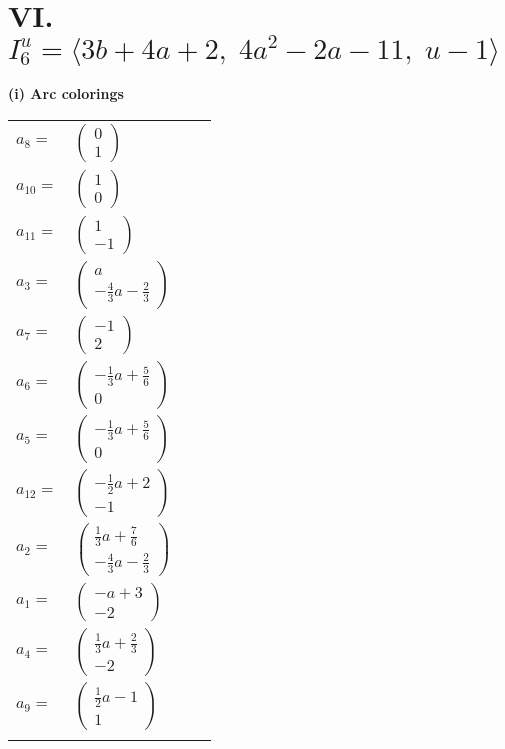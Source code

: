 \documentclass[1p]{elsarticle_modified}
\theoremstyle{definition}
\begin{document}
\centering \section*{VI. $I^u_{6}= \langle 3 b+4 a+2,\;4 a^2-2 a-11,\;u-1 \rangle$}
\flushleft \textbf{(i) Arc colorings}\\
\begin{tabular}{m{7pt} m{180pt} m{7pt} m{180pt} }
\flushright $a_{8}=$&$\begin{pmatrix}0\\1\end{pmatrix}$ \\
\flushright $a_{10}=$&$\begin{pmatrix}1\\0\end{pmatrix}$ \\
\flushright $a_{11}=$&$\begin{pmatrix}1\\-1\end{pmatrix}$ \\
\flushright $a_{3}=$&$\begin{pmatrix}a\\-\frac{4}{3} a-\frac{2}{3}\end{pmatrix}$ \\
\flushright $a_{7}=$&$\begin{pmatrix}-1\\2\end{pmatrix}$ \\
\flushright $a_{6}=$&$\begin{pmatrix}-\frac{1}{3} a+\frac{5}{6}\\0\end{pmatrix}$ \\
\flushright $a_{5}=$&$\begin{pmatrix}-\frac{1}{3} a+\frac{5}{6}\\0\end{pmatrix}$ \\
\flushright $a_{12}=$&$\begin{pmatrix}-\frac{1}{2} a+2\\-1\end{pmatrix}$ \\
\flushright $a_{2}=$&$\begin{pmatrix}\frac{1}{3} a+\frac{7}{6}\\-\frac{4}{3} a-\frac{2}{3}\end{pmatrix}$ \\
\flushright $a_{1}=$&$\begin{pmatrix}- a+3\\-2\end{pmatrix}$ \\
\flushright $a_{4}=$&$\begin{pmatrix}\frac{1}{3} a+\frac{2}{3}\\-2\end{pmatrix}$ \\
\flushright $a_{9}=$&$\begin{pmatrix}\frac{1}{2} a-1\\1\end{pmatrix}$\\&\end{tabular}
\end{document}
